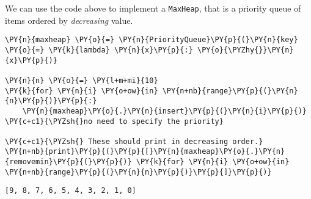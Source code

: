 We can use the code above to implement a \texttt{MaxHeap}, that is a priority queue of items ordered by \emph{decreasing} value.


\begin{Verbatim}[commandchars=\\\{\}]
\PY{n}{maxheap} \PY{o}{=} \PY{n}{PriorityQueue}\PY{p}{(}\PY{n}{key} \PY{o}{=} \PY{k}{lambda} \PY{n}{x}\PY{p}{:} \PY{o}{\PYZhy{}}\PY{n}{x}\PY{p}{)}

\PY{n}{n} \PY{o}{=} \PY{l+m+mi}{10}
\PY{k}{for} \PY{n}{i} \PY{o+ow}{in} \PY{n+nb}{range}\PY{p}{(}\PY{n}{n}\PY{p}{)}\PY{p}{:}
    \PY{n}{maxheap}\PY{o}{.}\PY{n}{insert}\PY{p}{(}\PY{n}{i}\PY{p}{)} \PY{c+c1}{\PYZsh{}no need to specify the priority}

\PY{c+c1}{\PYZsh{} These should print in decreasing order.}
\PY{n+nb}{print}\PY{p}{(}\PY{p}{[}\PY{n}{maxheap}\PY{o}{.}\PY{n}{removemin}\PY{p}{(}\PY{p}{)} \PY{k}{for} \PY{n}{i} \PY{o+ow}{in} \PY{n+nb}{range}\PY{p}{(}\PY{n}{n}\PY{p}{)}\PY{p}{]}\PY{p}{)}
\end{Verbatim}

\begin{Verbatim}
[9, 8, 7, 6, 5, 4, 3, 2, 1, 0]
\end{Verbatim}
